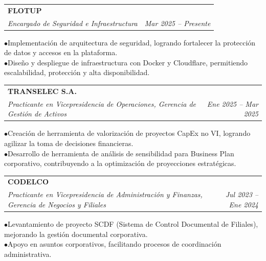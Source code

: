 \documentclass[11pt, a4paper]{article}
\begin{document}
\noindent\begin{tabularx}{\linewidth}{@{}X r@{}}
  \textbf{FLOTUP} & \\
  \textit{Encargado de Seguridad e Infraestructura} & \textit{Mar 2025 -- Presente} \\
\end{tabularx}
\hspace{1em}$\bullet$\enspace Implementación de arquitectura de seguridad, logrando fortalecer la protección de datos y accesos en la plataforma. \\
\hspace{1em}$\bullet$\enspace Diseño y despliegue de infraestructura con Docker y Cloudflare, permitiendo escalabilidad, protección y alta disponibilidad. \\
\vspace{4pt}

\noindent\begin{tabularx}{\linewidth}{@{}X r@{}}
  \textbf{TRANSELEC S.A.} & \\
  \textit{Practicante en Vicepresidencia de Operaciones, Gerencia de Gestión de Activos} & \textit{Ene 2025 -- Mar 2025} \\
\end{tabularx}
\hspace{1em}$\bullet$\enspace Creación de herramienta de valorización de proyectos CapEx no VI, logrando agilizar la toma de decisiones financieras. \\
\hspace{1em}$\bullet$\enspace Desarrollo de herramienta de análisis de sensibilidad para Business Plan corporativo, contribuyendo a la optimización de proyecciones estratégicas. \\
\vspace{4pt}

\noindent\begin{tabularx}{\linewidth}{@{}X r@{}}
  \textbf{CODELCO} & \\
  \textit{Practicante en Vicepresidencia de Administración y Finanzas, Gerencia de Negocios y Filiales} & \textit{Jul 2023 -- Ene 2024} \\
\end{tabularx}
\hspace{1em}$\bullet$\enspace Levantamiento de proyecto SCDF (Sistema de Control Documental de Filiales), mejorando la gestión documental corporativa. \\
\hspace{1em}$\bullet$\enspace Apoyo en asuntos corporativos, facilitando procesos de coordinación administrativa. \\
\vspace{4pt}
\end{document}
